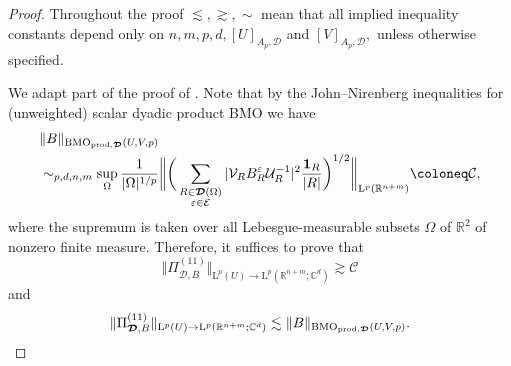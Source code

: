 \documentclass{article}
\theoremstyle{definition}
\theoremstyle{remark}
\numberwithin{equation}{section}
\newcommand{\cC}{\mathcal{C}}
\newcommand{\cE}{\mathcal{E}}
\newcommand{\cU}{\mathcal{U}}
\newcommand{\cV}{\mathcal{V}}
\newcommand{\bfD}{\bm{\mathcal{D}}}
\newcommand{\e}{\varepsilon}
\newcommand{\reals}{\mathbb{R}}
\newcommand{\complex}{\mathbb{C}}
\newcommand{\Lp}[1]{\mathrm{L}^{#1}}
\newcommand{\1}{\mathbf{1}}
\newcommand{\BMOprodD}{\ensuremath\text{BMO}_{\text{prod},\bfD}}
\begin{document}
    \begin{proof}
        Throughout the proof $\lesssim,\gtrsim,\sim$ mean that all implied inequality constants depend only on $n,m,p,d,[U]_{A_p,\bfD}$ and $[V]_{A_p,\bfD},$ unless otherwise specified.

        \item[(a)] We adapt part of the proof of \cite[Theorem 2.2]{Isralowitz_2017}. Note that by the John--Nirenberg inequalities for (unweighted) scalar dyadic product BMO we have
        \begin{align*}
            &\Vert B\Vert_{\BMOprodD(U,V,p)}\\
            &\sim_{p,d,n,m}\sup_{\Omega}\frac{1}{|\Omega|^{1/p}}\bigg\Vert\bigg(\sum_{\substack{R\in\bfD(\Omega)\\\e\in\cE}}|\cV_{R}B_{R}^{\e}\cU_{R}^{-1}|^2\frac{\1_{R}}{|R|}\bigg)^{1/2}\bigg\Vert_{\Lp{p}(\reals^{n+m})}\coloneq \cC,
        \end{align*}
        where the supremum is taken over all Lebesgue-measurable subsets $\Omega$ of $\reals^2$ of nonzero finite measure. Therefore, it suffices to prove that
        \begin{equation*}
            \Vert\Pi_{\bfD,B}^{(11)}\Vert_{\Lp{p}(U)\rightarrow \Lp{p}(\reals^{n+m};\complex^d)}\gtrsim\cC
        \end{equation*}
        and
        \begin{equation*}
            \Vert\Pi_{\bfD,B}^{(11)}\Vert_{\Lp{p}(U)\rightarrow \Lp{p}(\reals^{n+m};\complex^d)}\lesssim\Vert B\Vert_{\BMOprodD(U,V,p)}.
        \end{equation*}


\end{proof}
\end{document}
